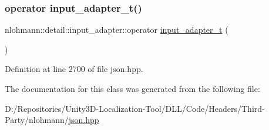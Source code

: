 \subsubsection{\texorpdfstring{operator input\_adapter\_t()}{operator input\_adapter\_t()}}
{\footnotesize\ttfamily nlohmann\+::detail\+::input\+\_\+adapter\+::operator \mbox{\hyperlink{namespacenlohmann_1_1detail_ae132f8cd5bb24c5e9b40ad0eafedf1c2}{input\+\_\+adapter\+\_\+t}} (\begin{DoxyParamCaption}{ }\end{DoxyParamCaption})\hspace{0.3cm}{\ttfamily [inline]}}



Definition at line 2700 of file json.\+hpp.



The documentation for this class was generated from the following file\+:\begin{DoxyCompactItemize}
\item 
D\+:/\+Repositories/\+Unity3\+D-\/\+Localization-\/\+Tool/\+D\+L\+L/\+Code/\+Headers/\+Third-\/\+Party/nlohmann/\mbox{\hyperlink{json_8hpp}{json.\+hpp}}\end{DoxyCompactItemize}
